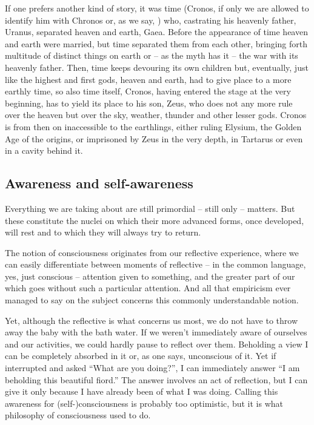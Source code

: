 \pa If one prefers another kind of story, it was time (Cronos, if only we are
allowed to identify him with Chronos or, as we say, )
who, castrating his heavenly father, Uranus, separated heaven and earth, Gaea.
Before the appearance of time heaven and earth were married, but time separated
them from each other, bringing forth multitude of distinct things on earth or --
as the myth has it -- the war with its heavenly father. Then, time keeps
devouring its own children but, eventually, just like the highest and first
gods, heaven and earth, had to give place to a more earthly time, so also time
itself, Cronos,  having entered the stage at the very
beginning, has to yield its place to his son, Zeus, who does not any more rule
over the heaven but over the sky, weather, thunder and other lesser gods. Cronos
is from then on inaccessible to the earthlings, either ruling Elysium, the
Golden Age of the origins, or imprisoned by Zeus in the very depth, in Tartarus
or even in a cavity behind it.


\subsection{{Awareness} and {self-awareness}}\label{sub:selfAware}

\pan Everything we are taking about
are still primordial -- 
still only  -- matters.  But these  constitute the
nuclei on which their more advanced forms, once developed, will rest
and to which they will always try to return. 


\pa
The notion of consciousness originates from our reflective experience, where we can 
easily differentiate between moments of reflective -- in the common language, 
yes, just conscious -- attention given to something, and the greater part 
of our  which goes without such a particular attention. And  all 
that empiricism ever managed to say on the subject concerns 
this commonly understandable notion.

Yet, although the reflective  is what concerns us most, we do not
have to throw away the baby with the bath water. If we weren't immediately aware
of ourselves and our activities, we could hardly pause to reflect over them.
Beholding a view I can be completely absorbed in it or, as one says, unconscious
of it. Yet if interrupted and asked ``What are you doing?'', I can immediately
answer ``I am beholding this beautiful fiord.'' The answer involves an act of
reflection, but I can give it only because I have already been  of
what I was doing. Calling this awareness for (self-)consciousness is probably
too optimistic, but it is what philosophy of consciousness used to do.

